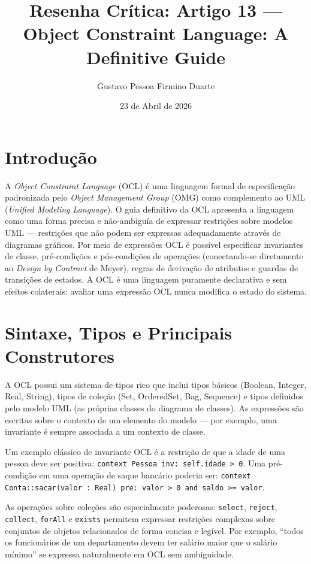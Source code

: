\documentclass[12pt,a4paper]{article}
\title{Resenha Cr\'itica: Artigo 13 ---\\
Object Constraint Language: A Definitive Guide}
\author{Gustavo Pessoa Firmino Duarte}
\date{23 de Abril de 2026}
\begin{document}
\maketitle

\section{Introdu\c{c}\~ao}

A \textit{Object Constraint Language} (OCL) \'e uma linguagem formal de especifica\c{c}\~ao
padronizada pelo \textit{Object Management Group} (OMG) como complemento ao UML
(\textit{Unified Modeling Language}). O guia definitivo da OCL apresenta a linguagem
como uma forma precisa e n\~ao-ambigu\'ia de expressar restri\c{c}\~oes sobre
modelos UML --- restri\c{c}\~oes que n\~ao podem ser expressas adequadamente
atrav\'es de diagramas gr\'aficos. Por meio de express\~oes OCL \'e poss\'ivel
especificar invariantes de classe, pr\'e-condi\c{c}\~oes e p\'os-condi\c{c}\~oes
de opera\c{c}\~oes (conectando-se diretamente ao \textit{Design by Contract} de
Meyer), regras de deriva\c{c}\~ao de atributos e guardas de transi\c{c}\~oes de
estados. A OCL \'e uma linguagem puramente declarativa e sem efeitos colaterais:
avaliar uma express\~ao OCL nunca modifica o estado do sistema.

\section{Sintaxe, Tipos e Principais Construtores}

A OCL possui um sistema de tipos rico que inclui tipos b\'asicos (Boolean, Integer,
Real, String), tipos de cole\c{c}\~ao (Set, OrderedSet, Bag, Sequence) e tipos
definidos pelo modelo UML (as pr\'oprias classes do diagrama de classes). As
express\~oes s\~ao escritas sobre o contexto de um elemento do modelo --- por
exemplo, uma invariante \'e sempre associada a um contexto de classe.

Um exemplo cl\'assico de invariante OCL \'e a restri\c{c}\~ao de que a idade de
uma pessoa deve ser positiva: \texttt{context Pessoa inv: self.idade > 0}. Uma
pr\'e-condi\c{c}\~ao em uma opera\c{c}\~ao de saque banc\'ario poderia ser:
\texttt{context Conta::sacar(valor : Real) pre: valor > 0 and saldo >= valor}.

As opera\c{c}\~oes sobre cole\c{c}\~oes s\~ao especialmente poderosas: \texttt{select},
\texttt{reject}, \texttt{collect}, \texttt{forAll} e \texttt{exists} permitem
expressar restri\c{c}\~oes complexas sobre conjuntos de objetos relacionados de
forma concisa e leg\'ivel. Por exemplo, ``todos os funcion\'arios de um departamento
devem ter sal\'ario maior que o sal\'ario m\'inimo'' se expressa naturalmente em
OCL sem ambiguidade.
\end{document}
